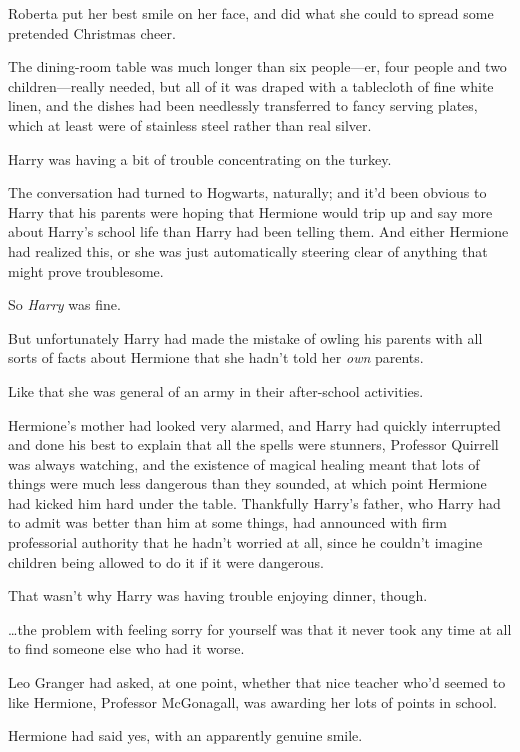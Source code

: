 Roberta put her best smile on her face, and did what she could to spread some pretended Christmas cheer.

\later

The dining-room table was much longer than six people---er, four people and two children---really needed, but all of it was draped with a tablecloth of fine white linen, and the dishes had been needlessly transferred to fancy serving plates, which at least were of stainless steel rather than real silver.

Harry was having a bit of trouble concentrating on the turkey.

The conversation had turned to Hogwarts, naturally; and it'd been obvious to Harry that his parents were hoping that Hermione would trip up and say more about Harry's school life than Harry had been telling them. And either Hermione had realized this, or she was just automatically steering clear of anything that might prove troublesome.

So \emph{Harry} was fine.

But unfortunately Harry had made the mistake of owling his parents with all sorts of facts about Hermione that she hadn't told her \emph{own} parents.

Like that she was general of an army in their after-school activities.

Hermione's mother had looked very alarmed, and Harry had quickly interrupted and done his best to explain that all the spells were stunners, Professor Quirrell was always watching, and the existence of magical healing meant that lots of things were much less dangerous than they sounded, at which point Hermione had kicked him hard under the table. Thankfully Harry's father, who Harry had to admit was better than him at some things, had announced with firm professorial authority that he hadn't worried at all, since he couldn't imagine children being allowed to do it if it were dangerous.

That wasn't why Harry was having trouble enjoying dinner, though.

{\ldots}the problem with feeling sorry for yourself was that it never took any time at all to find someone else who had it worse.

Leo Granger had asked, at one point, whether that nice teacher who'd seemed to like Hermione, Professor McGonagall, was awarding her lots of points in school.

Hermione had said yes, with an apparently genuine smile.

